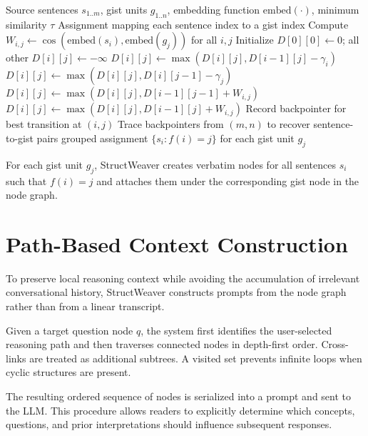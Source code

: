 \documentclass[manuscript,review,anonymous]{acmart}
\begin{document}
\begin{algorithm}[h]
\caption{Order-Preserving Gist--Sentence Alignment}
\label{alg:alignment}
\begin{algorithmic}[1]
\Require Source sentences $s_{1..m}$, gist units $g_{1..n}$, embedding function $\mathrm{embed}(\cdot)$, minimum similarity $\tau$
\Ensure Assignment mapping each sentence index to a gist index
\State Compute $W_{i,j} \gets \cos(\mathrm{embed}(s_i), \mathrm{embed}(g_j))$ for all $i,j$
\State Initialize $D[0][0] \gets 0$; all other $D[i][j] \gets -\infty$
 \State $D[i][j] \gets \max(D[i][j], D[i-1][j] - \gamma_i)$ 
 \EndIf
 \State $D[i][j] \gets \max(D[i][j], D[i][j-1] - \gamma_j)$ 
 \EndIf
 \State $D[i][j] \gets \max(D[i][j], D[i-1][j-1] + W_{i,j})$ 
 \State $D[i][j] \gets \max(D[i][j], D[i-1][j] + W_{i,j})$ 
 \EndIf
 \State Record backpointer for best transition at $(i,j)$
 \EndFor
\EndFor
\State Trace backpointers from $(m,n)$ to recover sentence-to-gist pairs
\State \Return grouped assignment $\{s_i : f(i)=j\}$ for each gist unit $g_j$
\end{algorithmic}
\end{algorithm}

For each gist unit $g_j$, StructWeaver creates verbatim nodes for all sentences $s_i$ such that $f(i)=j$ and attaches them under the corresponding gist node in the node graph.

\section{Path-Based Context Construction}
\label{appendix:context}

To preserve local reasoning context while avoiding the accumulation of irrelevant conversational history, StructWeaver constructs prompts from the node graph rather than from a linear transcript.

Given a target question node $q$, the system first identifies the user-selected reasoning path and then traverses connected nodes in depth-first order. Cross-links are treated as additional subtrees. A visited set prevents infinite loops when cyclic structures are present.

The resulting ordered sequence of nodes is serialized into a prompt and sent to the LLM. This procedure allows readers to explicitly determine which concepts, questions, and prior interpretations should influence subsequent responses.
\end{document}
